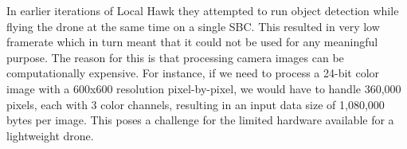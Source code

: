 In earlier iterations of Local Hawk they attempted to run object detection while flying the drone at the same time on a single SBC. This resulted in very low framerate which in turn meant that it could not be used for any meaningful purpose. The reason for this is that processing camera images can be computationally expensive. For instance, if we need to process a 24-bit color image with a 600x600 resolution pixel-by-pixel, we would have to handle 360,000 pixels, each with 3 color channels, resulting in an input data size of 1,080,000 bytes per image. This poses a challenge for the limited hardware available for a lightweight drone. \\





